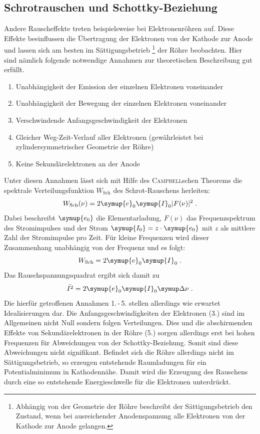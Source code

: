 \subsection{Schrotrauschen und Schottky-Beziehung}
%
Andere Rauscheffekte treten beispielsweise bei Elektronenröhren auf. Diese Effekte beeinflussen die Übertragung der Elektronen von der Kathode zur Anode und lassen sich am besten im Sättigungsbetrieb \footnote{Abhängig von der Geometrie der Röhre beschreibt der Sättigungsbetrieb den Zustand, wenn bei ausreichender Anodenspannung alle Elektronen von der Kathode zur Anode gelangen.} der Röhre beobachten. Hier sind nämlich folgende notwendige Annahmen zur theoretischen Beschreibung gut erfüllt.
%
\begin{enumerate}
  \item Unabhängigkeit der Emission der einzelnen Elektronen voneinander
  \item Unabhängigkeit der Bewegung der einzelnen Elektronen voneinander
  \item Verschwindende Anfangsgeschwindigkeit der Elektronen
  \item Gleicher Weg-Zeit-Verlauf aller Elektronen (gewährleistet bei zylindersymmetrischer Geometrie der Röhre)
  \item Keine Sekundärelektronen an der Anode
\end{enumerate}
%
Unter diesen Annahmen lässt sich mit Hilfe des \textsc{Campbell}schen Theorems die spektrale Verteilungsfunktion $W_\text{Sch}$ des Schrot-Rauschens herleiten:
%
\begin{equation}
  W_\text{Sch}(\nu)=2\symup{e}_0\symup{I}_0|F(\nu)|^2 \; .
\end{equation}
%
Dabei beschreibt $\symup{e_0}$ die Elementarladung, $F(\nu)$ das Frequenzspektrum des Stromimpulses und der Strom $\symup{I_0}=z\cdot \symup{e_0}$ mit $z$ als mittlere Zahl der Stromimpulse pro Zeit. Für kleine Frequenzen wird dieser Zusammenhang unabhängig von der Frequenz und es folgt:
%
\begin{equation}
  W_\text{Sch}=2\symup{e}_0\symup{I}_0 \; .
\end{equation}
%
Das Rauschspannungsquadrat ergibt sich damit zu
%
\begin{equation}
  \bar{I^2}=2\symup{e}_0\symup{I}_0\upD\nu \; .
  \label{eq:schottky}
\end{equation}
%
Die hierfür getroffenen Annahmen 1.\,-\,5. stellen allerdings wie erwartet Idealisierungen dar. Die Anfangsgeschwindigkeiten der Elektronen (3.) sind im Allgemeinen nicht Null sondern folgen Verteilungen. Dies und die abschirmenden Effekte von Sekundärelektronen in der Röhre (5.) sorgen allerdings erst bei hohen Frequenzen für Abweichungen von der Schottky-Beziehung. Somit sind diese Abweichungen nicht signifikant. Befindet sich die Röhre allerdings nicht im Sättigungsbetrieb, so erzeugen entstehende Raumladungen für ein Potentialminimum in Kathodennähe. Damit wird die Erzeugung des Rauschens durch eine so entstehende Energieschwelle für die Elektronen unterdrückt.

